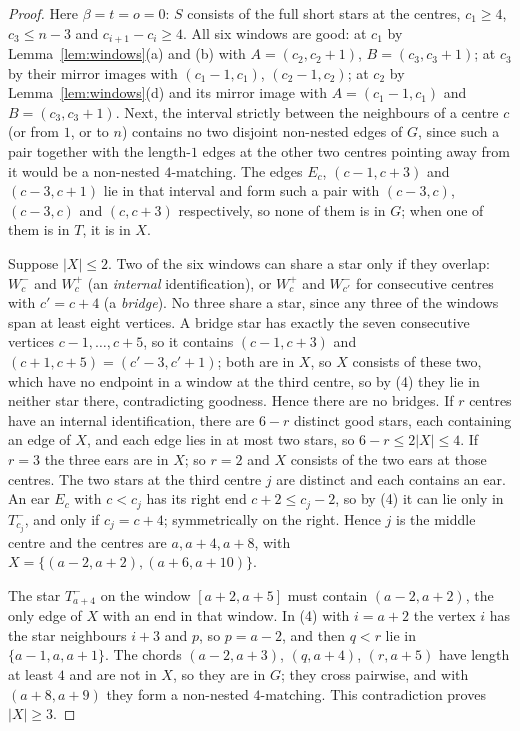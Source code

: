 \documentclass[11pt]{amsart}
\theoremstyle{definition}\newtheorem{problem}{Problem}
\theoremstyle{remark}\newtheorem*{remark}{Remark}
\begin{document}
\begin{proof}
Here $\beta=t=o=0$: $S$ consists of the full short stars at the centres, $c_1\ge4$, $c_3\le n-3$ and $c_{i+1}-c_i\ge4$.
All six windows are good: at $c_1$ by Lemma~\ref{lem:windows}(a) and (b) with $A=(c_2,c_2+1)$, $B=(c_3,c_3+1)$; at
$c_3$ by their mirror images with $(c_1-1,c_1)$, $(c_2-1,c_2)$; at $c_2$ by Lemma~\ref{lem:windows}(d) and its mirror
image with $A=(c_1-1,c_1)$ and $B=(c_3,c_3+1)$. Next, the interval strictly between the neighbours of a centre $c$ (or
from $1$, or to $n$) contains no two disjoint non-nested edges of $G$, since such a pair together with the length-$1$
edges at the other two centres pointing away from it would be a non-nested $4$-matching. The edges $E_c$,
$(c-1,c+3)$ and $(c-3,c+1)$ lie in that interval and form such a pair with $(c-3,c)$, $(c-3,c)$ and $(c,c+3)$
respectively, so none of them is in $G$; when one of them is in $T$, it is in $X$.

Suppose $|X|\le2$. Two of the six windows can share a star only if they overlap: $W_c^-$ and $W_c^+$ (an
\emph{internal} identification), or $W_c^+$ and $W_{c'}^-$ for consecutive centres with $c'=c+4$ (a \emph{bridge}). No
three share a star, since any three of the windows span at least eight vertices. A bridge star has exactly the seven
consecutive vertices $c-1,\dots,c+5$, so it contains $(c-1,c+3)$ and $(c+1,c+5)=(c'-3,c'+1)$; both are in $X$, so
$X$ consists of these two, which have no endpoint in a window at the third centre, so by (4) they lie in neither star
there, contradicting goodness. Hence there are no bridges. If $r$ centres have an internal identification, there are
$6-r$ distinct good stars, each containing an edge of $X$, and each edge lies in at most two stars, so $6-r\le2|X|\le4$.
If $r=3$ the three ears are in $X$; so $r=2$ and $X$ consists of the two ears at those centres. The two stars at the
third centre $j$ are distinct and each contains an ear. An ear $E_c$ with $c<c_j$ has its right end $c+2\le c_j-2$, so
by (4) it can lie only in $T^-_{c_j}$, and only if $c_j=c+4$; symmetrically on the right. Hence $j$ is the middle
centre and the centres are $a,a+4,a+8$, with $X=\{(a-2,a+2),(a+6,a+10)\}$.

The star $T^-_{a+4}$ on the window $[a+2,a+5]$ must contain $(a-2,a+2)$, the only edge of $X$ with an end in that
window. In (4) with $i=a+2$ the vertex $i$ has the star neighbours $i+3$ and $p$, so $p=a-2$, and then $q<r$ lie in
$\{a-1,a,a+1\}$. The chords $(a-2,a+3)$, $(q,a+4)$, $(r,a+5)$ have length at least $4$ and are not in $X$, so they are
in $G$; they cross pairwise, and with $(a+8,a+9)$ they form a non-nested $4$-matching. This contradiction proves
$|X|\ge3$.
\end{proof}
\end{document}
